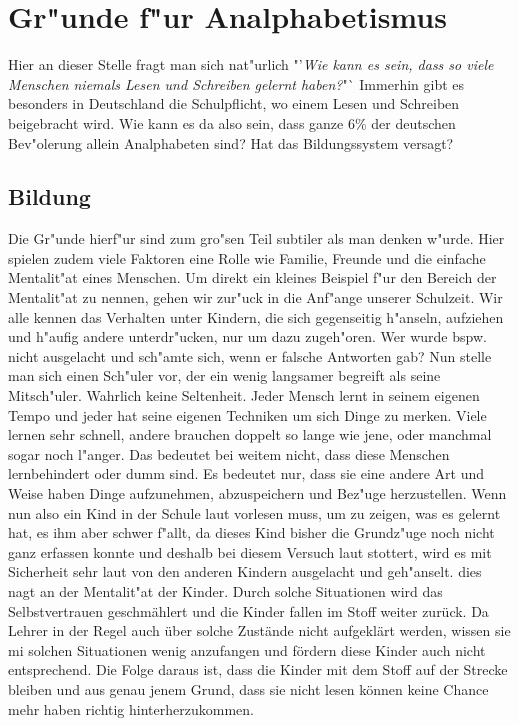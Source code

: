 \section{Gr"unde f"ur Analphabetismus}


Hier an dieser Stelle fragt man sich nat"urlich "'\textit{Wie kann es sein, dass so viele Menschen niemals Lesen und Schreiben gelernt haben?}"` Immerhin gibt es besonders in Deutschland die Schulpflicht, wo einem Lesen und Schreiben beigebracht wird. Wie kann es da also sein, dass ganze 6\% der deutschen Bev"olerung allein Analphabeten sind? Hat das Bildungssystem versagt? \\

\subsection{Bildung}
Die Gr"unde hierf"ur sind zum gro"sen Teil subtiler als man denken w"urde. Hier spielen zudem viele Faktoren eine Rolle wie Familie, Freunde und die einfache Mentalit"at eines Menschen. Um direkt ein kleines Beispiel f"ur den Bereich der Mentalit"at zu nennen, gehen wir zur"uck in die Anf"ange unserer Schulzeit. Wir alle kennen das Verhalten unter Kindern, die sich gegenseitig h"anseln, aufziehen und h"aufig andere unterdr"ucken, nur um dazu zugeh"oren. Wer wurde bspw. nicht ausgelacht und sch"amte sich, wenn er falsche Antworten gab? Nun stelle man sich einen Sch"uler vor, der ein wenig langsamer begreift als seine Mitsch"uler. Wahrlich keine Seltenheit. Jeder Mensch lernt in seinem eigenen Tempo und jeder hat seine eigenen Techniken um sich Dinge zu merken. Viele lernen sehr schnell, andere brauchen doppelt so lange wie jene, oder manchmal sogar noch l"anger. Das bedeutet bei weitem nicht, dass diese Menschen lernbehindert oder dumm sind. Es bedeutet nur, dass sie eine andere Art und Weise haben Dinge aufzunehmen, abzuspeichern und Bez"uge herzustellen. Wenn nun also ein Kind in der Schule laut vorlesen muss, um zu zeigen, was es gelernt hat, es ihm aber schwer f"allt, da dieses Kind bisher die Grundz"uge noch nicht ganz erfassen konnte und deshalb bei diesem Versuch laut stottert, wird es mit Sicherheit sehr laut von den anderen Kindern ausgelacht und geh"anselt. dies nagt an der Mentalit"at der Kinder. Durch solche Situationen wird das Selbstvertrauen geschmählert und die Kinder fallen im Stoff weiter zurück. Da Lehrer in der Regel auch über solche Zustände nicht aufgeklärt werden, wissen sie mi solchen Situationen wenig anzufangen und fördern diese Kinder auch nicht entsprechend. Die Folge daraus ist, dass die Kinder mit dem Stoff auf der Strecke bleiben und aus genau jenem Grund, dass sie nicht lesen können keine Chance mehr haben richtig hinterherzukommen.\\
